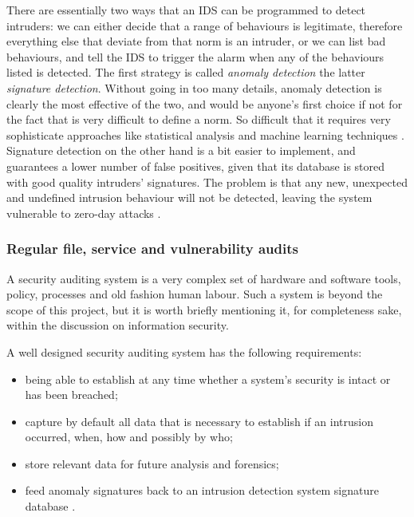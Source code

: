 There are essentially two ways that an IDS can be programmed to detect
intruders: we can either decide that a range of behaviours is legitimate,
therefore everything else that deviate from that norm is an intruder, or we can
list bad behaviours, and tell the IDS to trigger the alarm when any of the
behaviours listed is detected. The first strategy is called \emph{anomaly
detection} the latter \emph{signature detection}. Without going in too many
details, anomaly detection is clearly the most effective of the two, and would
be anyone's first choice if not for the fact that is very difficult to define a
norm. So difficult that it requires very sophisticate approaches like
statistical analysis and machine learning techniques \cite{GT09}. Signature
detection on the other hand is a bit easier to implement, and guarantees a lower
number of false positives, given that its database is stored with good quality
intruders' signatures. The problem is that any new, unexpected and undefined
intrusion behaviour will not be detected, leaving the system vulnerable to
zero-day attacks \cite{WS15}.

\subsubsection{Regular file, service and vulnerability audits}
A security auditing system is a very complex set of hardware and software tools,
policy, processes and old fashion human labour. Such a system is beyond the scope of
this project, but it is worth briefly mentioning it, for completeness sake,
within the discussion on information security.

A well designed security auditing system has the following requirements:
\begin{itemize}
  \item being able to establish at any time whether a system's security is
  intact or has been breached;
  \item capture by default all data that is necessary to establish if an
  intrusion occurred, when, how and possibly by who;
  \item store relevant data for future analysis and forensics;
  \item feed anomaly signatures back to an intrusion detection system signature
  database \cite{WS15}.
\end{itemize}

